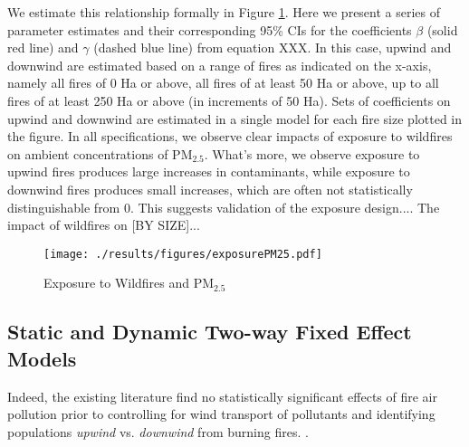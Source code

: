 \documentclass[11pt]{article}
\begin{document}
\begin{spacing}{1.3}
We estimate this relationship formally in Figure \ref{fig:firstStage}.  Here we present a series of parameter estimates and their corresponding 95\% CIs for the coefficients $\beta$ (solid red line) and $\gamma$ (dashed blue line) from equation XXX.  In this case, upwind and downwind are estimated based on a range of fires as indicated on the x-axis, namely all fires of 0 Ha or above, all fires of at least 50 Ha or above, up to all fires of at least 250 Ha or above (in increments of 50 Ha). Sets of coefficients on upwind and downwind are estimated in a single model for each fire size plotted in the figure.  In all specifications, we observe clear impacts of exposure to wildfires on ambient concentrations of PM$_{2.5}$.  What's more, we observe exposure to upwind fires produces large increases in contaminants, while exposure to downwind fires produces small increases, which are often not statistically distinguishable from 0. This suggests validation of the exposure design....  The impact of wildfires on [BY SIZE]...



\begin{figure}[htpb!]
    \caption{Exposure to Wildfires and PM$_{2.5}$}
    \label{fig:firstStage}
    \centering
    \texttt{[image: ./results/figures/exposurePM25.pdf]}
\end{figure}


\subsection{Static and Dynamic Two-way Fixed Effect Models}
\label{scn:results_2wayFE}
Indeed, the existing literature find no statistically significant effects of fire air pollution prior to controlling for wind transport of pollutants and identifying populations \textit{upwind} vs. \textit{downwind} from burning fires. \citep{RangelVogl2019,rocha2022winds,he2020straw,zivin2020unintended}.


\end{spacing}
\end{document}
